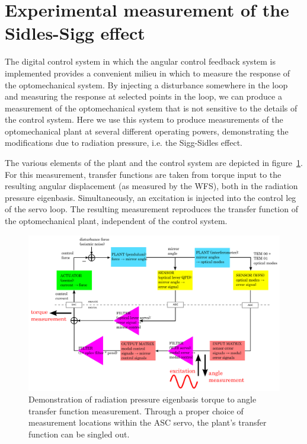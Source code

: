 




\section{Experimental measurement of the Sidles-Sigg effect}

The digital control system in which the angular control feedback
system is implemented provides a convenient milieu in which to measure
the response of the optomechanical system.  By injecting a disturbance
somewhere in the loop and measuring the response at selected points in
the loop, we can produce a measurement of the optomechanical system
that is not sensitive to the details of the control system.   Here we
use this system to produce measurements of the optomechanical plant at
several different operating powers, demonstrating the modifications due
to radiation pressure, i.e. the Sigg-Sidles effect.

The various elements of the plant and the control system are depicted
in figure~\ref{fig:RPTFmeasurement}.  For this measurement, transfer
functions are taken from torque input to the resulting angular
displacement (as measured by the WFS), both in the radiation pressure
eigenbasis.  Simultaneously, an excitation is injected into the
control leg of the servo loop.  The resulting measurement reproduces
the transfer function of the optomechanical plant, independent of the
control system.

\begin{figure}
\begin{centering}
\includegraphics[width=1.0\textwidth]{figures/ascservo_measurement.pdf}
\caption{Demonstration of radiation pressure eigenbasis torque to
  angle transfer function measurement. Through a proper choice of measurement
  locations within the ASC servo, the plant's transfer function can be
  singled out.}
\label{fig:RPTFmeasurement}
\end{centering}
\end{figure}

